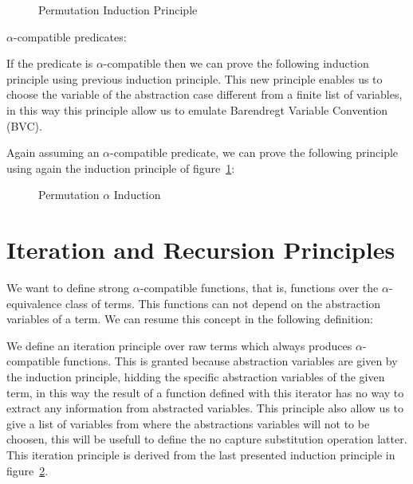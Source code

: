 \documentclass{article}
\begin{document}
\begin{figure}[!ht]
  \caption{Permutation Induction Principle}
\label{fig:permInd}
\end{figure}

$\alpha$-compatible predicates:

 \hspace{5px}

If the predicate is $\alpha$-compatible then we can prove the following induction principle using previous  induction principle. This new principle enables us to choose the variable of the abstraction case different from a finite list of variables, in this way this principle allow us to emulate Barendregt Variable Convention (BVC).

 \hspace{5px}

Again assuming an $\alpha$-compatible predicate, we can prove the following principle using again the induction principle of figure~\ref{fig:permInd}:

\begin{figure}[!ht]
  \caption{Permutation $\alpha$ Induction}
\label{fig:permAlphaInd}
\end{figure}

\section{Iteration and Recursion Principles}
\label{sec:recursion}

We want to define strong $\alpha$-compatible functions, that is, functions over the $\alpha$-equivalence class of terms. This functions can not depend on the abstraction variables of a term. We can resume this concept in the following definition:

 \hspace{5px}

We define an iteration principle over raw terms which always produces $\alpha$-compatible functions. This is granted because abstraction variables are given by the induction principle, hidding the specific abstraction variables of the given term, in this way the result of a function defined with this iterator has no way to extract any information from abstracted variables. This principle also allow us to give a list of variables from where the abstractions variables will not to be choosen, this will be usefull to define the no capture substitution operation latter. This iteration principle is derived from the last presented induction principle in figure~\ref{fig:permAlphaInd}. 
\end{document}
